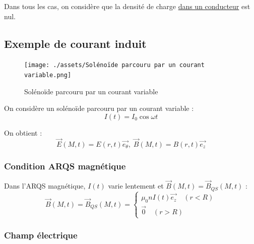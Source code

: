 Dans tous les cas, on considère que la densité de charge \underline{dans un conducteur} est nul.




\subsection{Exemple de courant induit} %
\label{sub:Exemple de courant induit}

\begin{figure}[H] %
  \centering
  \texttt{[image: ./assets/Solénoïde parcouru par un courant variable.png]}
  \caption{Solénoïde parcouru par un courant variable}
\end{figure}


On considère un solénoïde parcouru par un courant variable : 
\begin{equation}
  I(t) = I_0 \cos \omega t
\end{equation}


On obtient : 
\begin{equation}
  \overrightarrow{E}(M,t) = E(r,t) \overrightarrow{e _ \theta}, \; \overrightarrow{B}(M,t) = B(r,t) \overrightarrow{e_z}
\end{equation}

\subsubsection{Condition ARQS magnétique} %
\label{sec:Condition ARQS magnétique}


Dans l'ARQS magnétique, $I(t)$ varie lentement et $\overrightarrow{B}(M,t) = \overrightarrow{B} _{QS} (M,t)$ : 
\begin{equation}
  \overrightarrow{B}(M,t) = \overrightarrow{B} _{QS}(M,t) = \begin{cases}
    \mu_0 n I(t) \overrightarrow{e_z} \quad (r<R) \\ 
    \overrightarrow{0} \quad (r>R)
  \end{cases}
\end{equation}

\subsubsection{Champ électrique} %
\label{sec:Champ électrique}

